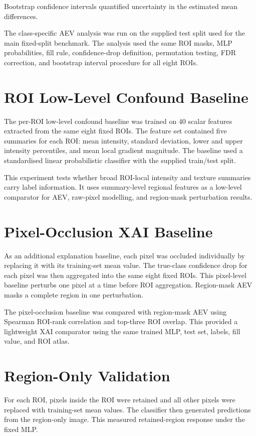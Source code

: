 Bootstrap confidence intervals quantified uncertainty in the estimated mean differences.

The class-specific AEV analysis was run on the supplied test split used for the main fixed-split benchmark. The analysis used the same ROI masks, MLP probabilities, fill rule, confidence-drop definition, permutation testing, FDR correction, and bootstrap interval procedure for all eight ROIs.


\section{ROI Low-Level Confound Baseline}

The per-ROI low-level confound baseline was trained on 40 scalar features extracted from the same eight fixed ROIs. The feature set contained five summaries for each ROI: mean intensity, standard deviation, lower and upper intensity percentiles, and mean local gradient magnitude. The baseline used a standardised linear probabilistic classifier with the supplied train/test split.


This experiment tests whether broad ROI-local intensity and texture summaries carry label information. It uses summary-level regional features as a low-level comparator for AEV, raw-pixel modelling, and region-mask perturbation results.


\section{Pixel-Occlusion XAI Baseline}

As an additional explanation baseline, each pixel was occluded individually by replacing it with its training-set mean value. The true-class confidence drop for each pixel was then aggregated into the same eight fixed ROIs. This pixel-level baseline perturbs one pixel at a time before ROI aggregation. Region-mask AEV masks a complete region in one perturbation.


The pixel-occlusion baseline was compared with region-mask AEV using Spearman ROI-rank correlation and top-three ROI overlap. This provided a lightweight XAI comparator using the same trained MLP, test set, labels, fill value, and ROI atlas.


\section{Region-Only Validation}

For each ROI, pixels inside the ROI were retained and all other pixels were replaced with training-set mean values. The classifier then generated predictions from the region-only image. This measured retained-region response under the fixed MLP.


